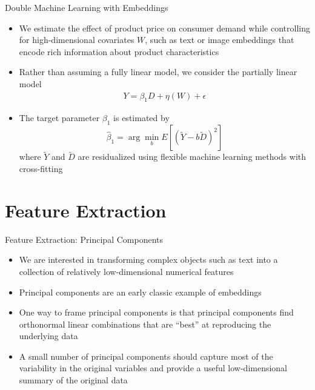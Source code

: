 \documentclass[aspectratio=1610,12pt,xcolor=dvipsnames]{beamer}
\begin{document}
\begin{frame}{Double Machine Learning with Embeddings}

\begin{itemize}
    \item We estimate the effect of product price on consumer demand while controlling for high-dimensional covariates $W$, such as text or image embeddings that encode rich information about product characteristics
    
    \item Rather than assuming a fully linear model, we consider the partially linear model
    \begin{align*}
        Y = \beta_1 D + \eta(W) + \epsilon
    \end{align*}
    
    \item The target parameter $\beta_1$ is estimated by
    \[
        \hat \beta_1
        =
        \arg\min_{b}
        E\!\left[(\tilde Y-b\tilde D)^2\right]
    \]
    where $\tilde Y$ and $\tilde D$ are residualized using flexible machine learning methods with cross-fitting
\end{itemize}
\end{frame}

\section{Feature Extraction}

\begin{frame}
  \sectionpage
\end{frame}

\begin{frame}{Feature Extraction: Principal Components}

\begin{itemize}
    \item We are interested in transforming complex objects such as text into a collection of relatively low-dimensional numerical features
    \item Principal components are an early classic example of embeddings
    \item One way to frame principal components is that principal components find orthonormal linear combinations that are ``best'' at reproducing the underlying data \pause
    \item A small number of principal components should capture most of the variability in the original variables and provide a useful low-dimensional summary of the original data
\end{itemize}
\end{frame}
\end{document}
